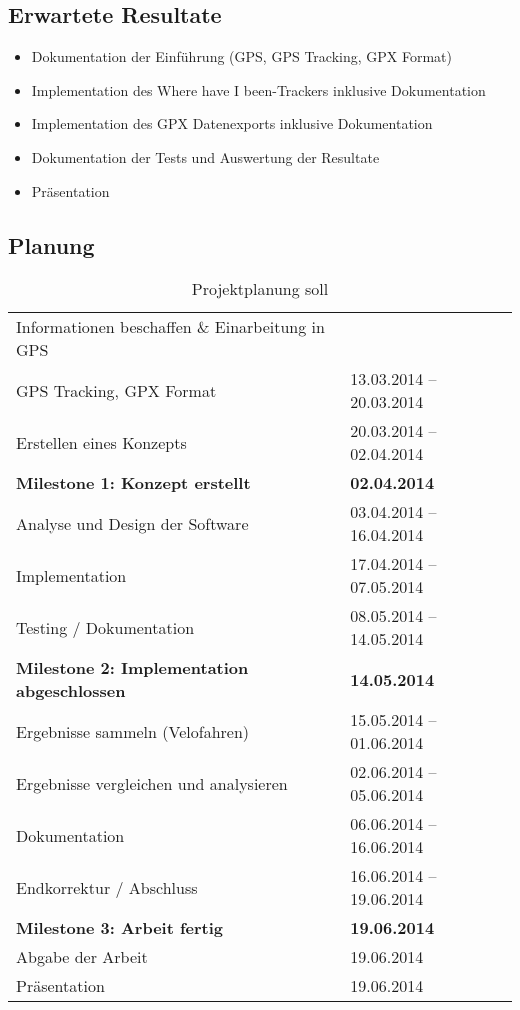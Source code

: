 \subsection{Erwartete Resultate}
\begin{itemize}
\item Dokumentation der Einführung (GPS, GPS Tracking, GPX Format)
\item Implementation des \flqq Where have I been\frqq-Trackers inklusive Dokumentation
\item Implementation des GPX Datenexports inklusive Dokumentation
\item Dokumentation der Tests und Auswertung der Resultate
\item Präsentation
\end{itemize}

\subsection{Planung}
\label{subsec:planung}
\begin{table}[H]
\begin{center}
\begin{tabular}{|l|l|}
	\hline
	Informationen beschaffen \& Einarbeitung in GPS & \\
	GPS Tracking, GPX Format & 13.03.2014 – 20.03.2014\\ \hline
	Erstellen eines Konzepts  & 20.03.2014 – 02.04.2014\\ \hline
	\textbf{Milestone 1: Konzept erstellt} & \textbf{02.04.2014}\\ \hline
	Analyse und Design der Software & 03.04.2014 – 16.04.2014\\ \hline
	Implementation & 17.04.2014 – 07.05.2014\\ \hline
	Testing / Dokumentation & 08.05.2014 – 14.05.2014\\ \hline
	\textbf{Milestone 2: Implementation abgeschlossen} & \textbf{14.05.2014} \\ \hline
	Ergebnisse sammeln (Velofahren) & 15.05.2014 – 01.06.2014\\ \hline
	Ergebnisse vergleichen und analysieren & 02.06.2014 – 05.06.2014\\ \hline
	Dokumentation & 06.06.2014 – 16.06.2014\\ \hline
	Endkorrektur / Abschluss & 16.06.2014 – 19.06.2014\\ \hline
	\textbf{Milestone 3: Arbeit fertig} & \textbf{19.06.2014} \\ \hline
	Abgabe der Arbeit & 19.06.2014 \\ \hline
	Präsentation & 19.06.2014 \\ \hline
\end{tabular}
\caption{Projektplanung soll}
\end{center}
\end{table}
